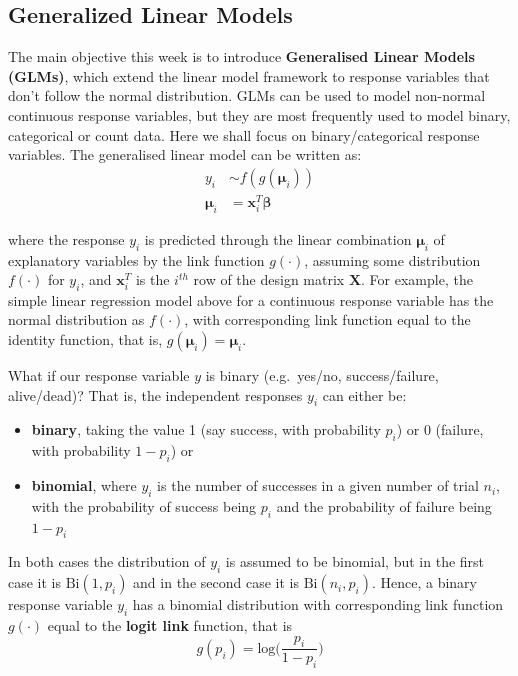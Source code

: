 \documentclass[]{article}
\providecommand{\tightlist}{%
  \setlength{\itemsep}{0pt}\setlength{\parskip}{0pt}}
\begin{document}
\subsection{Generalized Linear Models}\label{generalized-linear-models}

The main objective this week is to introduce \textbf{Generalised Linear
Models (GLMs)}, which extend the linear model framework to response
variables that don't follow the normal distribution. GLMs can be used to
model non-normal continuous response variables, but they are most
frequently used to model binary, categorical or count data. Here we
shall focus on binary/categorical response variables. The generalised
linear model can be written as:\\
\[
\begin{aligned}
y_i             &\sim f(g(\mathbf{\mu}_i)) \\
\mathbf{\mu}_i  &= \mathbf{x}^T_i \mathbf{\beta}
\end{aligned}
\]

where the response \(y_i\) is predicted through the linear combination
\(\mathbf{\mu}_i\) of explanatory variables by the link function
\(g(\cdot)\), assuming some distribution \(f(\cdot)\) for \(y_i\), and
\(\mathbf{x}^T_i\) is the \(i^{th}\) row of the design matrix
\(\mathbf{X}\). For example, the simple linear regression model above
for a continuous response variable has the normal distribution as
\(f(\cdot)\), with corresponding link function equal to the identity
function, that is, \(g(\mathbf{\mu}_i) = \mathbf{\mu}_i\).

What if our response variable \(y\) is binary (e.g.~yes/no,
success/failure, alive/dead)? That is, the independent responses \(y_i\)
can either be:

\begin{itemize}
\tightlist
\item
  \textbf{binary}, taking the value 1 (say success, with probability
  \(p_i\)) or 0 (failure, with probability \(1-p_i\)) or
\item
  \textbf{binomial}, where \(y_i\) is the number of successes in a given
  number of trial \(n_i\), with the probability of success being \(p_i\)
  and the probability of failure being \(1-p_i\)
\end{itemize}

In both cases the distribution of \(y_i\) is assumed to be binomial, but
in the first case it is \(\mbox{Bi}(1, p_i)\) and in the second case it
is \(\mbox{Bi}(n_i, p_i)\). Hence, a binary response variable \(y_i\)
has a binomial distribution with corresponding link function
\(g(\cdot)\) equal to the \textbf{logit link} function, that is\\
\[g(p_i) = \mbox{log} \Bigg( \frac{p_i}{1-p_i} \Bigg)\]
\end{document}

